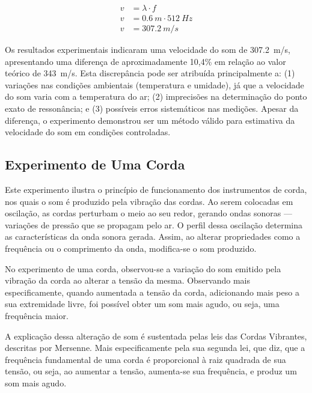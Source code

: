 \begin{align*}
	v &= \lambda \cdot f\\
	v &= \qty{0,6}{m} \cdot \qty{512}{Hz} \\
	v &= \qty{307,2}{m/s}
\end{align*}

Os resultados experimentais indicaram uma velocidade do som de \qty{307,2}{m/s}, apresentando uma diferença de aproximadamente 10,4\% em relação ao valor teórico de \qty{343}{m/s}. Esta discrepância pode ser atribuída principalmente a: (1) variações nas condições ambientais (temperatura e umidade), já que a velocidade do som varia com a temperatura do ar; (2) imprecisões na determinação do ponto exato de ressonância; e (3) possíveis erros sistemáticos nas medições. Apesar da diferença, o experimento demonstrou ser um método válido para estimativa da velocidade do som em condições controladas.

\subsection{Experimento de Uma Corda}
Este experimento ilustra o princípio de funcionamento dos instrumentos de corda, nos quais o som é produzido pela vibração das cordas. Ao serem colocadas em oscilação, as cordas perturbam o meio ao seu redor, gerando ondas sonoras — variações de pressão que se propagam pelo ar. O perfil dessa oscilação determina as características da onda sonora gerada. Assim, ao alterar propriedades como a frequência ou o comprimento da onda, modifica-se o som produzido.

No experimento de uma corda, observou-se a variação do som emitido pela vibração da corda ao alterar a tensão da mesma. Observando mais especificamente, quando aumentada a tensão da corda, adicionando mais peso a sua extremidade livre, foi possível obter um som mais agudo, ou seja, uma frequência maior.

A explicação dessa alteração de som é sustentada pelas leis das Cordas Vibrantes, descritas por Mersenne. Mais especificamente pela sua segunda lei, que diz, que a frequência fundamental de uma corda é proporcional à raiz quadrada de sua tensão, ou seja, ao aumentar a tensão, aumenta-se sua frequência, e produz um som mais agudo. 

